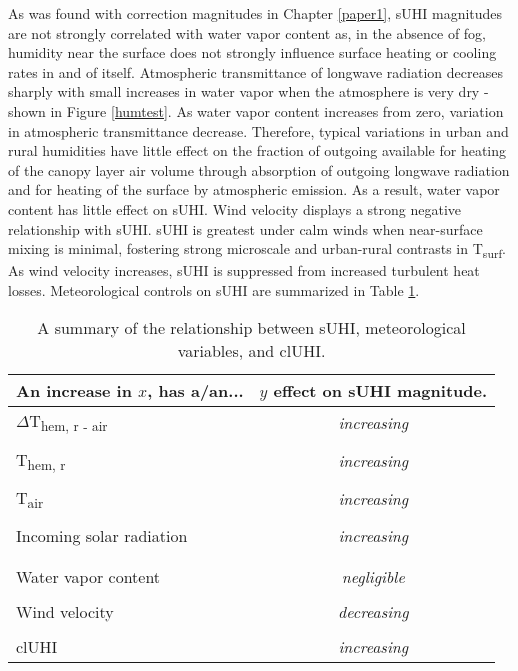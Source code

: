 As was found with correction magnitudes in Chapter \ref{paper1}, sUHI magnitudes are not strongly correlated with water vapor content as, in the absence of fog, humidity near the surface does not strongly influence surface heating or cooling rates in and of itself. Atmospheric transmittance of longwave radiation decreases sharply with small increases in water vapor when the atmosphere is very dry - shown in Figure \ref{humtest}. As water vapor content increases from zero, variation in atmospheric transmittance decrease. Therefore, typical variations in urban and rural humidities have little effect on the fraction of outgoing available for heating of the canopy layer air volume through absorption of outgoing longwave radiation and for heating of the surface by atmospheric emission. As a result, water vapor content has little effect on sUHI. Wind velocity displays a strong negative relationship with sUHI. sUHI is greatest under calm winds when near-surface mixing is minimal, fostering strong microscale and urban-rural contrasts in T\textsubscript{surf}. As wind velocity increases, sUHI is suppressed from increased turbulent heat losses. Meteorological controls on sUHI are summarized in Table \ref{meteo_cont}.

\begin{table}[H]
	\centering
	\caption{A summary of the relationship between sUHI, meteorological variables, and clUHI.}
	\label{meteo_cont}
	\begin{tabular}{lc}
		\toprule 
		An increase in $x$, has a/an... & $y$ effect on sUHI magnitude. \\
		\midrule
		$\Delta$T\textsubscript{hem, r - air} &\textit{increasing} \\
		&\\
		T\textsubscript{hem, r} & \textit{increasing} \\
		&\\
		T\textsubscript{air} & \textit{increasing} \\
		
		&\\
		Incoming solar radiation & \textit{increasing}  \\
		& \\
		& \\
		Water vapor content & \textit{negligible} \\
		&\\
		Wind velocity &\textit{decreasing} \\
		&\\
		clUHI &\textit{increasing} \\
		\bottomrule
	\end{tabular} 
\end{table}

